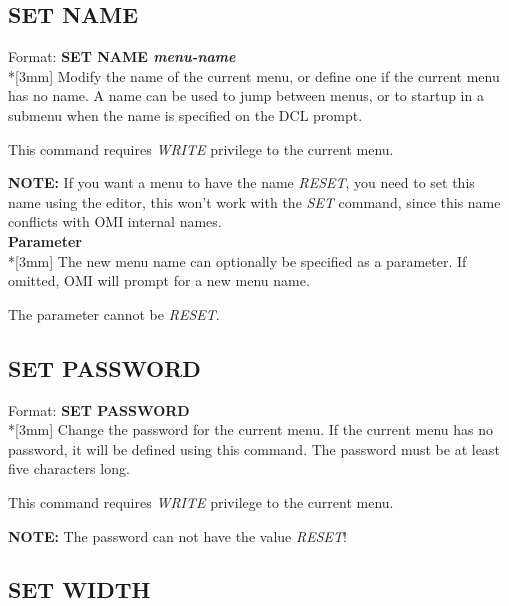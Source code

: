 \documentclass[a4paper]{book}
\newcommand{\vs}{\vspace{3mm}}
\renewcommand{\indent}{\hspace*{5mm}}
\begin{document}
\subsection{SET NAME}
\label{subsubsec:mylabel77}

\indent Format: \textbf{SET NAME \textit{menu-name}}\dag\\*[3mm]
Modify the name of the current menu, or define one if the current menu has 
no name. A name can be used to jump between menus, or to startup in a 
submenu when the name is specified on the DCL prompt.

This command requires \textsl{WRITE} privilege to the current menu.

\vs

\hspace{-8mm}\textbf{NOTE:} If you want a menu to have the name \textsl{RESET}, you need to set 
this name using the editor, this won't work with the \textsl{SET} command, since this 
name conflicts with OMI internal names.\\[3mm]
\textbf{Parameter}\\*[3mm]
The new menu name can optionally be specified as a parameter. If omitted, 
OMI will prompt for a new menu name.

The parameter cannot be \textsl{RESET}.

\subsection{SET PASSWORD}
\label{subsubsec:mylabel78}

\indent Format: \textbf{SET PASSWORD}\dag \\*[3mm]
Change the password for the current menu. If the current menu has no 
password, it will be defined using this command. The password must be at 
least five characters long.

This command requires \textsl{WRITE} privilege to the current menu.

\vs

\hspace{-8mm}\textbf{NOTE:} The password can not have the value \textsl{RESET}!

\subsection{SET WIDTH}
\label{subsubsec:mylabel79}
\end{document}
